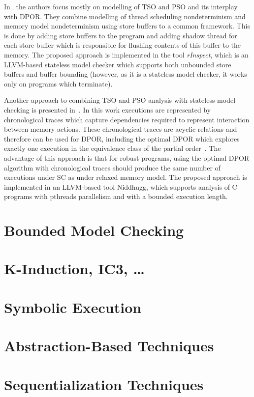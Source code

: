 In~\cite{Zhang2015} the authors focus mostly on modelling of TSO and PSO
and its interplay with DPOR. They combine modelling of thread scheduling
nondeterminism and memory model nondeterminism using store buffers to a
common framework. This is done by adding store buffers to the program
and adding shadow thread for each store buffer which is responsible for
flushing contents of this buffer to the memory. The proposed approach is
implemented in the tool \emph{rInspect}, which is an LLVM-based
stateless model checker which supports both unbounded store buffers and
buffer bounding (however, as it is a stateless model checker, it works
only on programs which terminate).

Another approach to combining TSO and PSO analysis with stateless model
checking is presented in~\cite{Abdulla2015}. In this work executions are
represented by chronological traces which capture dependencies required
to represent interaction between memory actions. These chronological
traces are acyclic relations and therefore can be used for DPOR,
including the optimal DPOR which explores exactly one execution in the
equivalence class of the partial order~\cite{Abdulla2014}. The advantage
of this approach is that for robust programs, using the optimal DPOR
algorithm with chronological traces should produce the same number of
executions under SC as under relaxed memory model. The proposed approach
is implemented in an LLVM-based tool Niddhugg, which supports analysis
of C programs with pthreads parallelism and with a bounded execution
length.

\section{Bounded Model Checking}

\section{K-Induction, IC3, …}

\section{Symbolic Execution}

\section{Abstraction-Based Techniques}

\section{Sequentialization Techniques}


